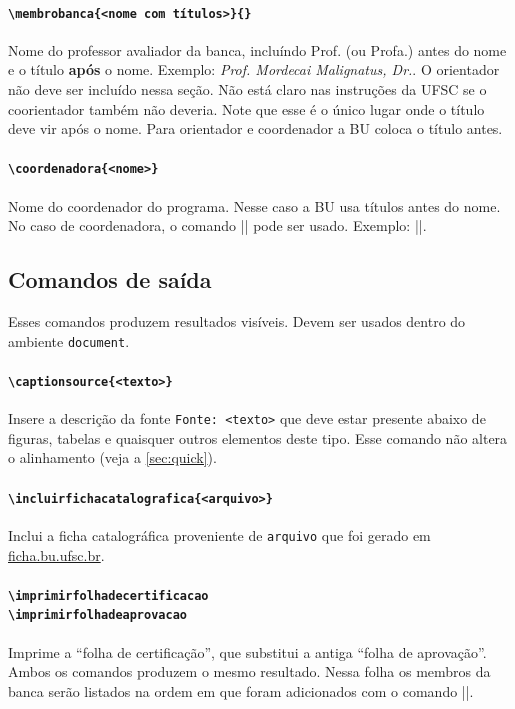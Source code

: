 \documentclass[embeddedlogo]{../ufsc-thesis-rn46-2019}
\begin{document}
\paragraph*{\texttt{\textbackslash{}membrobanca\{<nome com
títulos>\}\{<universidade por extenso>\}}}
Nome do professor avaliador da banca, incluíndo Prof. (ou Profa.) antes do
nome e o título \textbf{após} o nome. Exemplo: \emph{Prof. Mordecai
Malignatus, Dr.}. O orientador não deve ser incluído nessa seção. Não está
claro nas instruções da UFSC se o coorientador também não deveria. Note que
esse é o único lugar onde o título deve vir após o nome. Para orientador e
coordenador a BU coloca o título antes.

\paragraph*{\texttt{\textbackslash{}coordenadora\{<nome>\}}} Nome do
coordenador do programa. Nesse caso a BU usa títulos antes do nome. No caso de
coordenadora, o comando \mt|\coordenadora| pode ser usado. Exemplo:
\mt||.

\subsection{Comandos de saída}

Esses comandos produzem resultados visíveis. Devem ser usados dentro do
ambiente \texttt{document}.

\paragraph*{\texttt{\textbackslash{}captionsource\{<texto>\}}} Insere a
descrição da fonte \texttt{Fonte: <texto>} que deve estar presente abaixo de
figuras, tabelas e quaisquer outros elementos deste tipo. Esse comando não
altera o alinhamento (veja a \autoref{sec:quick}).

\paragraph*{\texttt{\textbackslash{}incluirfichacatalografica\{<arquivo>\}}}
Inclui a ficha catalográfica proveniente de \texttt{arquivo} que foi gerado em
\href{http://ficha.bu.ufsc.br/}{ficha.bu.ufsc.br}.

\paragraph*{\texttt{\textbackslash{}imprimirfolhadecertificacao}\\
            \texttt{\textbackslash{}imprimirfolhadeaprovacao}
} 
Imprime a ``folha de certificação'', que substitui a antiga ``folha de
aprovação''. Ambos os comandos produzem o mesmo resultado. Nessa folha
os membros da banca serão listados na ordem em que foram adicionados
com o comando \mt||.
\end{document}
